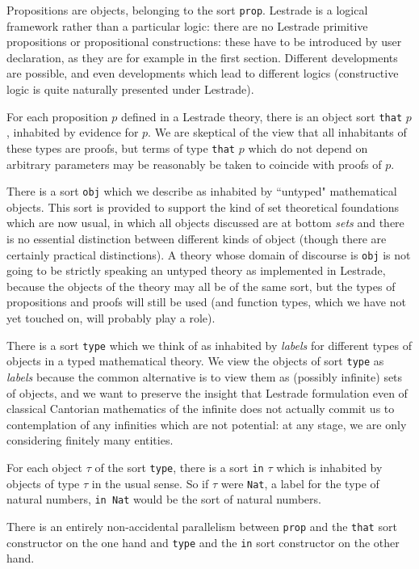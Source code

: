 \documentclass[12pt]{article}
\begin{document}
Propositions are objects, belonging to the sort {\tt prop}.  Lestrade is a logical framework rather than a particular logic:  there are no Lestrade primitive propositions or propositional constructions:  these have to be introduced by user declaration, as they are for example in the first section.  Different developments are possible, and even developments which lead to different logics (constructive logic is quite naturally presented under Lestrade).

For each proposition $p$ defined in a Lestrade theory, there is an object sort {\tt that} $p$, inhabited by evidence for $p$.   We are skeptical of the view that all inhabitants of these types are proofs, but terms of type {\tt that} $p$ which do not depend on arbitrary parameters may be reasonably be taken to coincide with proofs of $p$.

There is a sort {\tt obj} which we describe as inhabited by ``untyped" mathematical objects.  This sort is provided to support the kind of set theoretical foundations which are now usual, in which all objects discussed are at bottom {\em sets\/} and there is no essential distinction between different kinds of object (though there are certainly practical distinctions).  A theory whose domain of discourse is {\tt obj} is not going to be strictly speaking an untyped theory as implemented in Lestrade, because the objects of the theory may all be of the same sort, but the types of propositions and proofs will still be used (and function types, which we have not yet touched on, will probably play a role).

There is a sort {\tt type} which we think of as inhabited by {\em labels\/} for different types of objects in a typed mathematical theory.  We view the objects of sort {\tt type} as {\em labels\/} because the common alternative is to view them as (possibly infinite) sets of objects, and we want to preserve the insight that Lestrade formulation even of classical Cantorian mathematics of the infinite does not actually commit us to contemplation of any infinities which are not potential:  at any stage, we are only considering finitely many entities.

For each object $\tau$ of the sort {\tt type}, there is a sort {\tt in} $\tau$ which is inhabited by objects of type $\tau$ in the usual sense.  So if $\tau$ were {\tt Nat}, a label for the type of natural numbers, {\tt in Nat} would be the sort of natural numbers.

There is an entirely non-accidental parallelism between {\tt prop} and the {\tt that} sort constructor on the one hand
and {\tt type} and the {\tt in} sort constructor on the other hand.
\end{document}
